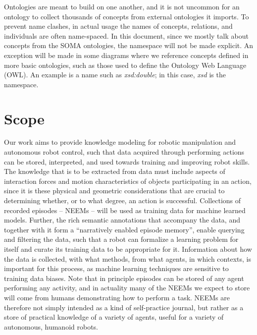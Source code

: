 Ontologies are meant to build on one another, and it is not uncommon for an ontology to collect thousands of concepts from external ontologies it imports.
To prevent name clashes, in actual usage the names of concepts, relations, and individuals are often name-spaced.
In this document, since we mostly talk about concepts from the SOMA ontologies,
the namespace will not be made explicit.
An exception will be made in some diagrams where we reference concepts defined in more basic ontologies,
such as those used to define the Ontology Web Language (OWL).
An example is a name such as \emph{xsd:double}; in this case, \emph{xsd} is the namespace.

\section{Scope} %
\label{sec:scope}

Our work aims to provide knowledge modeling for robotic manipulation and autonomous robot control, such that data acquired through performing actions can be stored, interpreted, and used towards training and improving robot skills. 
The knowledge that is to be extracted from data must include aspects of interaction forces and motion characteristics of objects participating in an action, since it is these physical and geometric considerations that are crucial to determining whether, or to what degree, an action is successful. Collections of recorded episodes -- NEEMs -- will be used as training data for machine learned models. Further, the rich semantic annotations that accompany the data, and together with it form a ``narratively enabled episode memory'', enable querying and filtering the data, such that a robot can formalize a learning problem for itself and curate its training data to be appropriate for it. Information about how the data is collected, with what methods, from what agents, in which contexts, is important for this process, as machine learning techniques are sensitive to training data biases. Note that in principle episodes can be stored of any agent performing any activity, and in actuality many of the NEEMs we expect to store will come from humans demonstrating how to perform a task. NEEMs are therefore not simply intended as a kind of self-practice journal, but rather as a store of practical knowledge of a variety of agents, useful for a variety of autonomous, humanoid robots.

